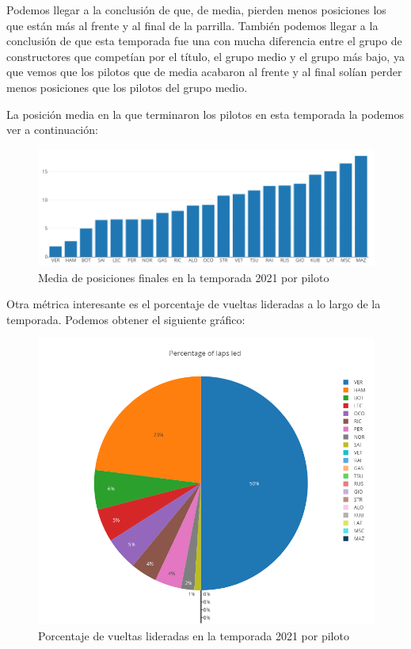\documentclass[12pt,twoside,titlepage]{report}
\begin{document}
Podemos llegar a la conclusión de que, de media, pierden menos posiciones los que están más al frente y al final de la parrilla. También podemos llegar a la conclusión de que esta temporada fue una con mucha diferencia entre el grupo de constructores que competían por el título, el grupo medio y el grupo más bajo, ya que vemos que los pilotos que de media acabaron al frente y al final solían perder menos posiciones que los pilotos del grupo medio.

La posición media en la que terminaron los pilotos en esta temporada la podemos ver a continuación:

\begin{figure}[H]
	\includegraphics[scale=0.4]{results/seasonanalysis/avgfinishpos2021.png}
	\centering
	\caption{Media de posiciones finales en la temporada 2021 por piloto}
	\label{fig:avgFinPos2021}
	\centering
\end{figure}

Otra métrica interesante es el porcentaje de vueltas lideradas a lo largo de la temporada. Podemos obtener el siguiente gráfico:

\begin{figure}[H]
	\includegraphics[scale=0.35]{results/seasonanalysis/percLapsLed2021.png}
	\centering
	\caption{Porcentaje de vueltas lideradas en la temporada 2021 por piloto}
	\label{fig:percLapsLed2021}
	\centering
\end{figure}
\end{document}

